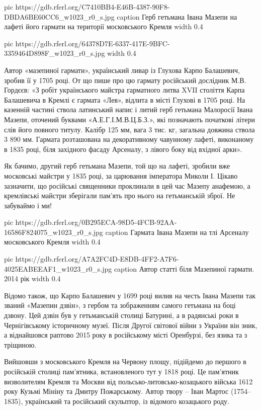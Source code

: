 \ifcmt
  pic https://gdb.rferl.org/C7410BB4-E46B-4387-90F8-DBDA6BE60CC6_w1023_r0_s.jpg
  caption Герб гетьмана Івана Мазепи на лафеті його гармати на території московського Кремля
	width 0.4
	
	pic https://gdb.rferl.org/64378D7E-6337-417E-9BFC-3359464D898F_w1023_r0_s.jpg
	width 0.4
\fi

Автор «мазепиної гармати», український ливар із Глухова Карпо Балашевич, зробив
її у 1705 році. От що пише про цю гармату російський дослідник М.В. Гордєєв: «З
робіт українського майстра гарматного литва XVII століття Карпа Балашевича в
Кремлі є гармата «Лев», відлита в місті Глухові в 1705 році. На казенній
частині ствола латинський напис і литий герб гетьмана Малоросії Івана Мазепи,
оточений буквами «А.Е.Г.І.М.В.Ц.Б.З.», які позначають початкові літери слів
його повного титулу. Калібр 125 мм, вага 3 тис. кг, загальна довжина ствола 3
890 мм. Гармата розташована на декоративному чавунному лафеті, виконаному в
1835 році, біля західного фасаду Арсеналу, з лівого боку від вхідної арки».

Як бачимо, другий герб гетьмана Мазепи, той що на лафеті, зробили вже
московські майстри у 1835 році, за царювання імператора Миколи І. Цікаво
зазначити, що російські священники проклинали в цей час Мазепу анафемою, а
кремлівські майстри зберігали пам'ять про нього на гетьманській зброї. Не
забуваймо і ми!

\ifcmt
  pic https://gdb.rferl.org/0B295ECA-98D5-4FCB-92AA-16586F824075_w1023_r0_s.jpg
	caption Гармата Івана Мазепи на тлі Арсеналу московського Кремля
	width 0.4

	pic https://gdb.rferl.org/A7A2FC4D-E8DB-4FF2-A7F6-4025EABEEAF1_w1023_r0_s.jpg
	caption Автор статті біля Мазепиної гармати. 2014 рік
	width 0.4
\fi

Відомо також, що Карпо Балашевич у 1699 році вилив на честь Івана Мазепи так
званий «Мазепин дзвін», з гербом та зображенням самого гетьмана на боці дзвону.
Цей дзвін був у гетьманській столиці Батурині, а в радянські роки в
Чернігівському історичному музеї. Після Другої світової війни з України він
зник, а віднайшовся раптово 2015 року в російському місті Оренбурзі, без язика
та з тріщиною.

Вийшовши з московського Кремля на Червону площу, підійдемо до першого в
російській столиці пам'ятника, встановленого тут у 1818 році. Це пам'ятник
визволителям Кремля та Москви від польсько-литовсько-козацького війська 1612
року Кузьмі Мініну та Дмитру Пожарському. Автор твору – Іван Мартос
(1754–1835), український та російський скульптор, із відомого козацького роду.


